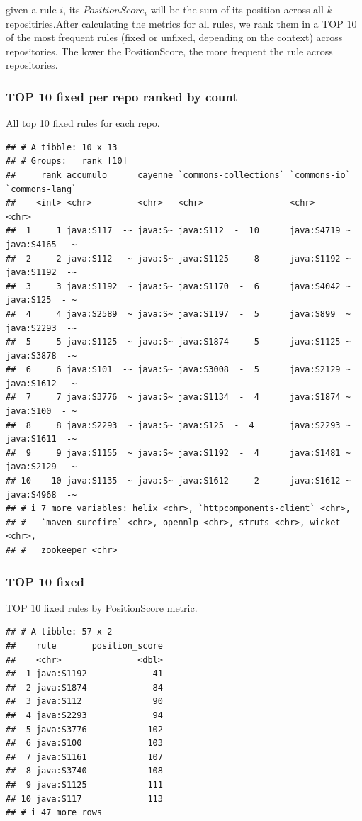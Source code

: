 \documentclass[
]{article}
\begin{document}
given a rule \(i\), its \(PositionScore_{i}\) will be the sum of its
position across all \(k\) repositiries.After calculating the metrics for
all rules, we rank them in a TOP 10 of the most frequent rules (fixed or
unfixed, depending on the context) across repositories. The lower the
PositionScore, the more frequent the rule across repositories.

\subsubsection{TOP 10 fixed per repo ranked by
count}\label{top-10-fixed-per-repo-ranked-by-count}

All top 10 fixed rules for each repo.

\begin{verbatim}
## # A tibble: 10 x 13
## # Groups:   rank [10]
##     rank accumulo      cayenne `commons-collections` `commons-io` `commons-lang`
##    <int> <chr>         <chr>   <chr>                 <chr>        <chr>         
##  1     1 java:S117  -~ java:S~ java:S112  -  10      java:S4719 ~ java:S4165  -~
##  2     2 java:S112  -~ java:S~ java:S1125  -  8      java:S1192 ~ java:S1192  -~
##  3     3 java:S1192  ~ java:S~ java:S1170  -  6      java:S4042 ~ java:S125  - ~
##  4     4 java:S2589  ~ java:S~ java:S1197  -  5      java:S899  ~ java:S2293  -~
##  5     5 java:S1125  ~ java:S~ java:S1874  -  5      java:S1125 ~ java:S3878  -~
##  6     6 java:S101  -~ java:S~ java:S3008  -  5      java:S2129 ~ java:S1612  -~
##  7     7 java:S3776  ~ java:S~ java:S1134  -  4      java:S1874 ~ java:S100  - ~
##  8     8 java:S2293  ~ java:S~ java:S125  -  4       java:S2293 ~ java:S1611  -~
##  9     9 java:S1155  ~ java:S~ java:S1192  -  4      java:S1481 ~ java:S2129  -~
## 10    10 java:S1135  ~ java:S~ java:S1612  -  2      java:S1612 ~ java:S4968  -~
## # i 7 more variables: helix <chr>, `httpcomponents-client` <chr>,
## #   `maven-surefire` <chr>, opennlp <chr>, struts <chr>, wicket <chr>,
## #   zookeeper <chr>
\end{verbatim}

\subsubsection{TOP 10 fixed}\label{top-10-fixed}

TOP 10 fixed rules by PositionScore metric.

\begin{verbatim}
## # A tibble: 57 x 2
##    rule       position_score
##    <chr>               <dbl>
##  1 java:S1192             41
##  2 java:S1874             84
##  3 java:S112              90
##  4 java:S2293             94
##  5 java:S3776            102
##  6 java:S100             103
##  7 java:S1161            107
##  8 java:S3740            108
##  9 java:S1125            111
## 10 java:S117             113
## # i 47 more rows
\end{verbatim}
\end{document}
